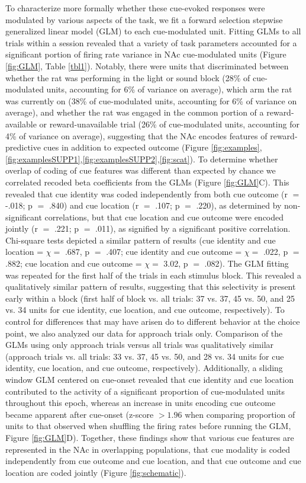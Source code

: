 \documentclass[11pt]{article}
\begin{document}
To characterize more formally whether these cue-evoked responses were modulated by various aspects of the task, we fit a forward selection stepwise generalized linear model (GLM) to each cue-modulated unit. Fitting GLMs to all trials within a session revealed that a variety of task parameters accounted for a significant portion of firing rate variance in NAc cue-modulated units (Figure \ref{fig:GLM}, Table \ref{tbl1}). Notably, there were units that discriminated between whether the rat was performing in the light or sound block (28\% of cue-modulated units, accounting for 6\% of variance on average), which arm the rat was currently on (38\% of cue-modulated units, accounting for 6\% of variance on average), and whether the rat was engaged in the common portion of a reward-available or reward-unavailable trial (26\% of cue-modulated units, accounting for 4\% of variance on average), suggesting that the NAc encodes features of reward-predictive cues in addition to expected outcome (Figure \ref{fig:examples},\ref{fig:examplesSUPP1},\ref{fig:examplesSUPP2},\ref{fig:scat}). To determine whether overlap of coding of cue features was different than expected by chance we correlated recoded beta coefficients from the GLMs (Figure \ref{fig:GLM}C). This revealed that cue identity was coded independently from both cue outcome (r $=$ -.018; p $=$ .840) and cue location (r $=$ .107; p $=$ .220), as determined by non-significant correlations, but that cue location and cue outcome were encoded jointly (r $=$ .221; p $=$ .011), as signified by a significant positive correlation. Chi-square tests depicted a similar pattern of results (cue identity and cue location = $\chi =$ .687, p $=$ .407; cue identity and cue outcome = $\chi =$ .022, p $=$ .882; cue location and cue outcome = $\chi =$ 3.02, p $=$ .082). The GLM fitting was repeated for the first half of the trials in each stimulus block. This revealed a qualitatively similar pattern of results, suggesting that this selectivity is present early within a block (first half of block vs. all trials: 37 vs. 37, 45 vs. 50, and 25 vs. 34 units for cue identity, cue location, and cue outcome, respectively). To control for differences that may have arisen do to different behavior at the choice point, we also analyzed our data for approach trials only. Comparison of the GLMs using only approach trials versus all trials was qualitatively similar (approach trials vs. all trials: 33 vs. 37, 45 vs. 50, and 28 vs. 34 units for cue identity, cue location, and cue outcome, respectively).  Additionally, a sliding window GLM centered on cue-onset revealed that cue identity and cue location contributed to the activity of a significant proportion of cue-modulated units throughout this epoch, whereas an increase in units encoding cue outcome became apparent after cue-onset (z-score $>1.96$ when comparing proportion of units to that observed when shuffling the firing rates before running the GLM, Figure \ref{fig:GLM}D). Together, these findings show that various cue features are represented in the NAc in overlapping populations, that cue modality is coded independently from cue outcome and cue location, and that cue outcome and cue location are coded jointly (Figure \ref{fig:schematic}).
\end{document}
